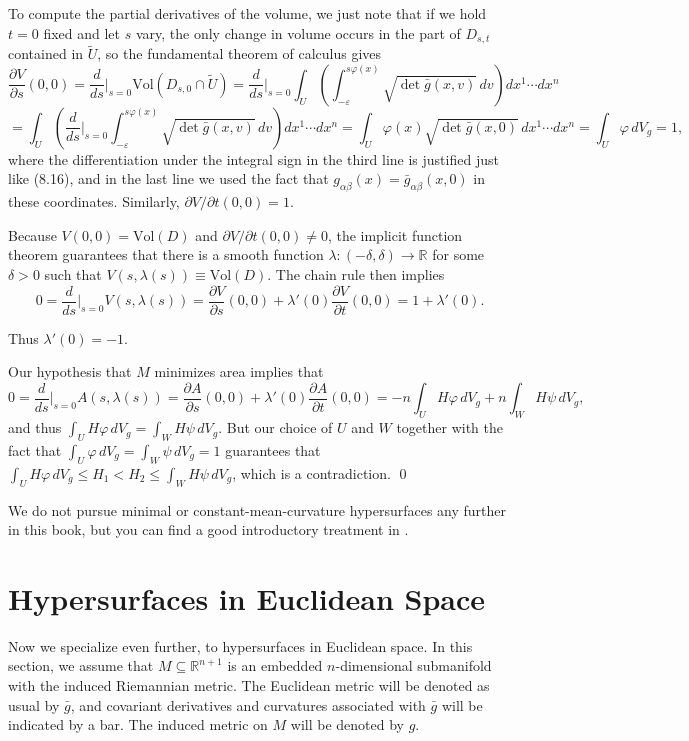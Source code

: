 To compute the partial derivatives of the volume, we just note that if we hold $t = 0$ fixed and let $s$ vary, the only change in volume occurs in the part of $D_{s,t}$ contained in $\tilde{U}$, so the fundamental theorem of calculus gives
\[
\frac{\partial V}{\partial s}(0,0) = \frac{d}{ds}\bigg|_{s=0} \text{Vol}(D_{s,0} \cap \tilde{U})
= \frac{d}{ds}\bigg|_{s=0} \int_U \left(\int_{-\varepsilon}^{s\varphi(x)} \sqrt{\det\bar{g}(x,v)}\,dv\right) dx^1 \cdots dx^n
\]
\[
= \int_U \left(\frac{d}{ds}\bigg|_{s=0} \int_{-\varepsilon}^{s\varphi(x)} \sqrt{\det\bar{g}(x,v)}\,dv\right) dx^1 \cdots dx^n
= \int_U \varphi(x)\sqrt{\det\bar{g}(x,0)}\,dx^1 \cdots dx^n = \int_U \varphi\,dV_g = 1,
\]
where the differentiation under the integral sign in the third line is justified just like (8.16), and in the last line we used the fact that $g_{\alpha\beta}(x) = \bar{g}_{\alpha\beta}(x,0)$ in these coordinates. Similarly, $\partial V/\partial t(0,0) = 1$.

Because $V(0,0) = \text{Vol}(D)$ and $\partial V/\partial t(0,0) \neq 0$, the implicit function theorem guarantees that there is a smooth function $\lambda : (-\delta, \delta) \to \mathbb{R}$ for some $\delta > 0$ such that $V(s, \lambda(s)) \equiv \text{Vol}(D)$. The chain rule then implies
\[
0 = \frac{d}{ds}\bigg|_{s=0} V(s, \lambda(s)) = \frac{\partial V}{\partial s}(0,0) + \lambda'(0)\frac{\partial V}{\partial t}(0,0) = 1 + \lambda'(0).
\]

Thus $\lambda'(0) = -1$.

Our hypothesis that $M$ minimizes area implies that
\[
0 = \frac{d}{ds}\bigg|_{s=0} A(s, \lambda(s)) = \frac{\partial A}{\partial s}(0,0) + \lambda'(0) \frac{\partial A}{\partial t}(0,0)
= -n \int_U H\varphi \, dV_g + n \int_W H\psi \, dV_g,
\]
and thus $\int_U H\varphi \, dV_g = \int_W H\psi \, dV_g$. But our choice of $U$ and $W$ together with the fact that $\int_U \varphi \, dV_g = \int_W \psi \, dV_g = 1$ guarantees that $\int_U H\varphi \, dV_g \leq H_1 < H_2 \leq \int_W H\psi \, dV_g$, which is a contradiction. \qed

We do not pursue minimal or constant-mean-curvature hypersurfaces any further in this book, but you can find a good introductory treatment in \cite{CM11}.

\section{Hypersurfaces in Euclidean Space}

Now we specialize even further, to hypersurfaces in Euclidean space. In this section, we assume that $M \subseteq \mathbb{R}^{n+1}$ is an embedded $n$-dimensional submanifold with the induced Riemannian metric. The Euclidean metric will be denoted as usual by $\bar{g}$, and covariant derivatives and curvatures associated with $\bar{g}$ will be indicated by a bar. The induced metric on $M$ will be denoted by $g$.


